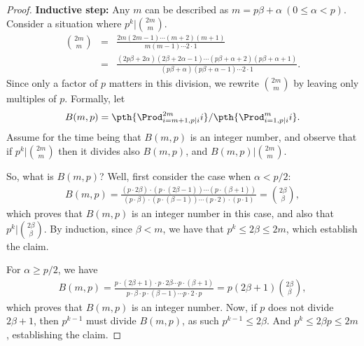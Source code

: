 \documentclass[11pt]{article}
\begin{document}
\begin{enumerate}
\begin{enumerate}
\begin{proof}
            {\bf Inductive step:} Any $m$ can be described
            as $m=p\beta+\alpha\ (0 \le \alpha < p)$.
            Consider a situation where $p^k|{2m\choose{m}}$.
            \begin{eqnarray*}
                {2m\choose{m}}&=&\frac{2m(2m-1)\cdots 
                   (m+2)(m+1)}{m(m-1)\cdots 2\cdot 1}\\
                &=&\frac{(2p\beta + 2\alpha)(2\beta +
                   2\alpha - 1)
                   \cdots (p\beta+\alpha +2)(p\beta + \alpha+1)}
                {(p\beta+\alpha)(p\beta+\alpha-1)\cdots 2\cdot 1}.
            \end{eqnarray*}
            Since only a factor of $p$ matters in this division, we rewrite
            $2m\choose{m}$ by leaving only multiples of
            $p$. Formally, let 
            \[
            B(m,p) =
            \pth{\Prod_{i=m+1, p | i}^{2m} i}
            / \pth{\Prod_{i=1, p | i}^{m} i}.
            \]
            Assume for the time being that $B(m,p)$ is an
            integer number, and observe that if $p^k |
            \binom{2m}{m}$ then it divides also $B(m,p)$,
            and $B(m,p) | \binom{2m}{m}$.  

            So, what is $B(m,p)$? Well, first consider
            the case when $\alpha < p/2$:
            \begin{eqnarray*}
                B(m,p) = \frac{(p\cdot 2\beta) \cdot (p\cdot
                   (2\beta-1)) \cdots (p\cdot(\beta + 1))}
                {(p\cdot\beta)\cdot (p\cdot(\beta-1))
                   \cdots (p\cdot 2) \cdot (p \cdot 1)}
                =\binom{2\beta}{\beta},
            \end{eqnarray*}
            which proves that $B(m,p)$ is an integer number
            in this case, and also that $p^k |
            \binom{2\beta}{\beta}$. By induction, since
            $\beta < m$, we have that $p^k \leq 2\beta \leq
            2m$, which establish the claim.
            
            For $\alpha \geq p/2$, we have
            \begin{eqnarray*}
                B(m,p) = 
                \frac{p\cdot (2\beta + 1)\cdot
                   p\cdot 2\beta\cdots p\cdot(\beta
                   + 1)}
                {p\cdot\beta\cdot
                   p\cdot(\beta-1)\cdots p\cdot 2
                   \cdot p} = p(2\beta + 1 ) \binom{2\beta}{\beta},
            \end{eqnarray*}
            which proves that $B(m,p)$ is an integer
            number. Now, if $p$ does not divide $2\beta +
            1$, then $p^{k-1}$ must divide $B(m,p)$, as such
            $p^{k-1} \leq 2\beta$. And $p^k \leq 2 \beta p
            \leq 2m$, establishing the claim.
            

\end{proof}
\end{enumerate}
\end{enumerate}
\end{document}
